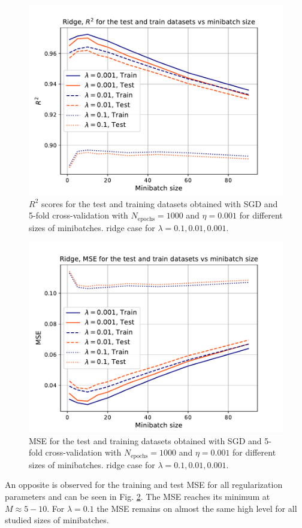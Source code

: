 \documentclass{emulateapj}
\begin{document}
\begin{figure}[t!]
    \centering
    \includegraphics[width=.49\textwidth]{Figures/ridge_R2_minibatch.pdf}
    \caption{$R^2$ scores for the test and training datasets obtained with SGD and 5-fold cross-validation with $N_{\mathrm{epochs}}=1000$ and $\eta=0.001$ for different sizes of minibatches. ridge case for $\lambda=0.1,0.01,0.001$.}
    \label{fig: R2_ridge_minibatch}
\end{figure}

\begin{figure}[!ht]
    \centering
    \includegraphics[width=.49\textwidth]{Figures/ridge_MSE_minibatch.pdf}
    \caption{MSE for the test and training datasets obtained with SGD and 5-fold cross-validation with $N_{\mathrm{epochs}}=1000$ and $\eta=0.001$ for different sizes of minibatches. ridge case for $\lambda=0.1,0.01,0.001$.}
    \label{fig: MSE_ridge_minibatch}
\end{figure}

An opposite is observed for the training and test MSE for all regularization parameters and can be seen in Fig. \ref{fig: MSE_ridge_minibatch}. The MSE reaches its minimum at $M\approx5-10$. For $\lambda=0.1$ the MSE remains on almost the same high level for all studied sizes of minibatches.
\end{document}
